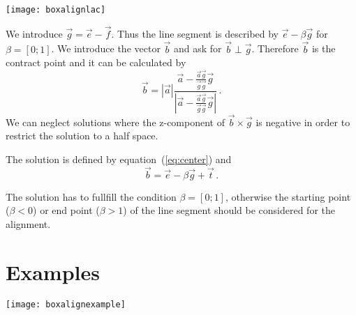 \documentclass{article}
\begin{document}
\centerline{\texttt{[image: boxalignlac]}}

We introduce $\vec g=\vec e-\vec f$. Thus the line segment is
described by $\vec e-\beta \vec g$ for $\beta=[0;1]$. We introduce the
vector $\vec b$ and ask for $\vec b\perp\vec g$. Therefore $\vec b$ is
the contract point and it can be calculated by
\begin{equation}
\vec b=|\vec a|\frac{\vec a-\frac{\vec a\vec g}{\vec g\vec g}\vec g}
                    {\left|\vec a-\frac{\vec a\vec g}{\vec g\vec g}\vec g\right|}\,.
\end{equation}
We can neglect solutions where the z-component of $\vec b\times\vec g$
is negative in order to restrict the solution to a half space.

The solution is defined by equation~(\ref{eq:center}) and
\begin{equation}
\vec b=\vec e-\beta\vec g+\vec t\,.
\end{equation}

The solution has to fullfill the condition $\beta=[0;1]$, otherwise
the starting point ($\beta<0$) or end point ($\beta>1$) of the line
segment should be considered for the alignment.

\section{Examples}
\texttt{[image: boxalignexample]}
\end{document}
